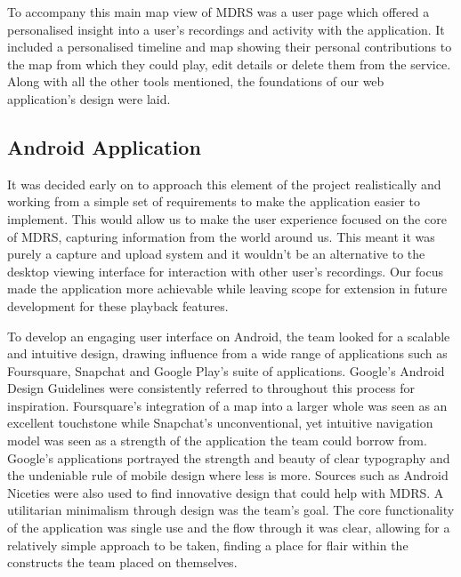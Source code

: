\documentclass{l3proj}
\begin{document}
To accompany this main map view of MDRS was a user page which offered a personalised insight into a user's recordings and activity with the application. It included a personalised timeline and map showing their personal contributions to the map from which they could play, edit details or delete them from the service. Along with all the other tools mentioned, the foundations of our web application's design were laid.

\subsection{Android Application} It was decided early on to approach this element of the project realistically and working from a simple set of requirements to make the application easier to implement. This would allow us to make the user experience focused on the core of MDRS, capturing information from the world around us. This meant it was purely a capture and upload system and it wouldn't be an alternative to the desktop viewing interface for interaction with other user's recordings. Our focus made the application more achievable while leaving scope for extension in future development for these playback features.

To develop an engaging user interface on Android, the team looked for a scalable and intuitive design, drawing influence from a wide range of applications such as Foursquare, Snapchat\cite{snapchat} and Google Play’s suite of applications\cite{playmusic}. Google's Android Design Guidelines\cite{guidelines} were consistently referred to throughout this process for inspiration.  Foursquare's integration of a map into a larger whole was seen as an excellent touchstone while Snapchat's unconventional, yet intuitive navigation model was seen as a strength of the application the team could borrow from. Google's applications portrayed the strength and beauty of clear typography and the undeniable rule of mobile design where less is more. Sources such as Android Niceties\cite{androidniceties} were also used to find innovative design that could help with MDRS. A utilitarian minimalism through design was the team's goal. The core functionality of the application was single use and the flow through it was clear, allowing for a relatively simple approach to be taken, finding a place for flair within the constructs the team placed on themselves.
\end{document}

